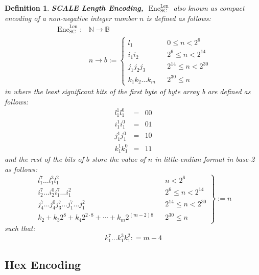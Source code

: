 \documentclass{article}
\newcommand{\assign}{:=}
\newcommand{\cdummy}{\cdot}
\newcommand{\nosymbol}{}
\newcommand{\tmop}[1]{\ensuremath{\operatorname{#1}}}
\newcommand{\tmstrong}[1]{\textbf{#1}}
\newcommand{\tmtextbf}[1]{{\bfseries{#1}}}
\newtheorem{definition}{Definition}
\providecommand{\cdummy}{{\cdot}}
\providecommand{\nosymbol}{}
\providecommand{\tmop}[1]{\ensuremath{\mathrm{#1}}}
\providecommand{\tmstrong}[1]{\tmtextbf{#1}}
\providecommand{\tmtextbf}[1]{\tmtextbf{#1}}
\newtheorem{definition}{Definition}
\begin{document}
\begin{definition}
  \label{defn-sc-len-encoding}{\tmstrong{SCALE Length Encoding,
  $\tmop{Enc}^{\tmop{Len}}_{\tmop{SC}}$}} also known as compact encoding of a
  non-negative integer number $n$ is defined as follows:
  \[ \begin{array}{ll}
       \tmop{Enc}^{\tmop{Len}}_{\tmop{SC}} : & \mathbb{N} \rightarrow
       \mathbb{B}\\
       & n \rightarrow b \assign \left\{ \begin{array}{lll}
         l^{\nosymbol}_1 &  & 0 \leqslant n < 2^6\\
         i^{\nosymbol}_1 i^{\nosymbol}_2 &  & 2^6 \leqslant n < 2^{14}\\
         j^{\nosymbol}_1 j^{\nosymbol}_2 j_3 &  & 2^{14} \leqslant n <
         2^{30}\\
         k_1^{\nosymbol} k_2^{\nosymbol} \ldots k_m^{\nosymbol}  &  & 2^{30}
         \leqslant n
       \end{array} \right.
     \end{array} \]
  in where the least significant bits of the first byte of byte array b are
  defined as follows:
  \[ \begin{array}{lcc}
       l^1_1 l_1^0 & = & 00\\
       i^1_1 i_1^0 & = & 01\\
       j^1_1 j_1^0 & = & 10\\
       k^1_1 k_1^0 & = & 11
     \end{array} \]
  and the rest of the bits of $b$ store the value of $n$ in little-endian
  format in base-2 as follows:
  \[ \left. \begin{array}{lll}
       l^7_1 \ldots l^3_1 l^2_1 &  & n < 2^6\\
       i_2^7 \ldots i_2^0 i_1^7 \ldots i^2_1^{\nosymbol} &  & 2^6 \leqslant n
       < 2^{14}\\
       j_4^7 \ldots j_4^0 j_3^7 \ldots j_1^7 \ldots j^2_1 &  & 2^{14}
       \leqslant n < 2^{30}\\
       k_2 + k_3 2^8 + k_4 2^{2 \cdummy 8} + \cdots + k_m 2^{(m - 2) 8} &  &
       2^{30} \leqslant n
     \end{array} \right\} \assign n \]
  such that:
  \[ k^7_1 \ldots k^3_1 k^2_1 : = m - 4 \]
\end{definition}

\subsection{Hex Encoding}
\end{document}
